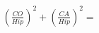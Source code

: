 \documentclass[preview]{standalone}
\begin{document}
\begin{align*}
\left(\frac{CO}{Hip}\right)^2+\left(\frac{CA}{Hip}\right)^2=
\end{align*}
\end{document}
